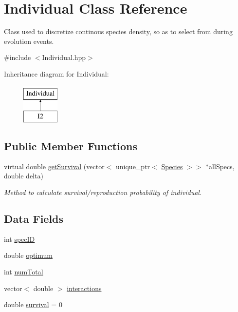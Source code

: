 \hypertarget{classIndividual}{}\section{Individual Class Reference}
\label{classIndividual}


Class used to discretize continous species density, so as to select from during evolution events.  




{\ttfamily \#include $<$Individual.\+hpp$>$}

Inheritance diagram for Individual\+:\begin{figure}[H]
\begin{center}
\leavevmode
\includegraphics[height=2.000000cm]{classIndividual}
\end{center}
\end{figure}
\subsection*{Public Member Functions}
\begin{DoxyCompactItemize}
\item 
virtual double \hyperlink{classIndividual_a895954f2c3a683dd3bd7475651a38160}{get\+Survival} (vector$<$ unique\+\_\+ptr$<$ \hyperlink{classSpecies}{Species} $>$$>$ $\ast$all\+Specs, double delta)
\begin{DoxyCompactList}\small\item\em Method to calculate survival/reproduction probability of individual. \end{DoxyCompactList}\end{DoxyCompactItemize}
\subsection*{Data Fields}
\begin{DoxyCompactItemize}
\item 
int \hyperlink{classIndividual_a2a7068df27211ad0b2e869a3c628cd9f}{spec\+ID}
\item 
double \hyperlink{classIndividual_adc6dbb93690c48fbba745ce0fcf6d5b0}{optimum}
\item 
int \hyperlink{classIndividual_a78e6327a339aa73f73d81e991b3fede2}{num\+Total}
\item 
vector$<$ double $>$ \hyperlink{classIndividual_ac832077568d1e59f979af3fe6bd7e3e6}{interactions}
\item 
double \hyperlink{classIndividual_adbd7cefa7cf5847a6a20e14c04ab20dd}{survival} = 0
\end{DoxyCompactItemize}


